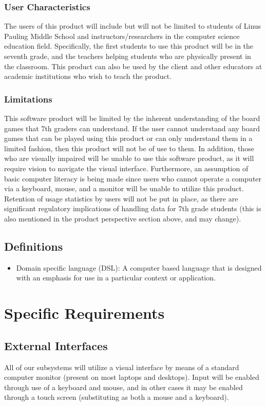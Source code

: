 \documentclass[10pt,letter,draftclsnofoot,onecolumn]{IEEEtran}
\begin{document}
\begin{singlespace}
    \subsubsection{User Characteristics}
        The users of this product will include but will not be limited to students of Linus Pauling Middle School and instructors/researchers in the computer science education field. Specifically, the first students to use this product will be in the seventh grade, and the teachers helping students who are physically present in the classroom. This product can also be used by the client and other educators at academic institutions who wish to teach the product.
        
    \subsubsection{Limitations}
        This software product will be limited by the inherent understanding of the board games that 7th graders can understand. If the user cannot understand any board games that can be played using this product or can only understand them in a limited fashion, then this product will not be of use to them. In addition, those who are visually impaired will be unable to use this software product, as it will require vision to navigate the visual interface. Furthermore, an assumption of basic computer literacy is being made since users who cannot operate a computer via a keyboard, mouse, and a monitor will be unable to utilize this product. Retention of usage statistics by users will not be put in place, as there are significant regulatory implications of handling data for 7th grade students (this is also mentioned in the product perspective section above, and may change).
        
    \subsection{Definitions}
        \begin{itemize}
            \item Domain specific language (DSL): A computer based language that is designed with an emphasis for use in a particular context or application.
        \end{itemize}
    
\section{Specific Requirements}
    \subsection{External Interfaces}
        All of our subsystems will utilize a visual interface by means of a standard computer monitor (present on most laptops and desktops). Input will be enabled through use of a keyboard and mouse, and in other cases it may be enabled through a touch screen (substituting as both a mouse and a keyboard).
        

\end{singlespace}
\end{document}
